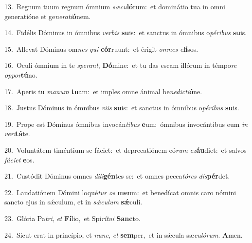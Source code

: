 {\numbfont\textcolor{\numbcolor}{13.}}~Regnum tuum regnum ómnium \textit{sæ}\-\textit{cu}\textbf{ló}rum:~\star et dominátio tua in omni generatióne et ge\-\textit{ne}\-\textit{ra}\textit{ti}\textbf{ó}nem.\par
{\numbfont\textcolor{\numbcolor}{14.}}~Fidélis Dóminus in ómnibus \textit{ver}\-\textit{bis} \textbf{su}\-is:~\star et sanctus in ómnibus o\-\textit{pé}\-\textit{ri}\textit{bus} \textbf{su}\-is.\par
{\numbfont\textcolor{\numbcolor}{15.}}~Allevat Dóminus om\textit{nes} \textit{qui} \textbf{cór}\-ruunt:~\star et érigit \textit{om}\-\textit{nes} \textit{e}\-\textbf{lí}sos.\par
{\numbfont\textcolor{\numbcolor}{16.}}~Oculi ómnium in te \textit{spe}\-\textit{rant}, \textbf{Dó}\-mine:~\star et tu das escam illórum in témpo\textit{re} \textit{op}\-\textit{por}\textbf{tú}no.\par
{\numbfont\textcolor{\numbcolor}{17.}}~Aperis tu \textit{ma}\-\textit{num} \textbf{tu}\-am:~\star et imples omne ánimal be\-\textit{ne}\-\textit{dic}\textit{ti}\textbf{ó}ne.\par
{\numbfont\textcolor{\numbcolor}{18.}}~Justus Dóminus in ómnibus \textit{vi}\-\textit{is} \textbf{su}\-is:~\star et sanctus in ómnibus o\-\textit{pé}\-\textit{ri}\textit{bus} \textbf{su}\-is.\par
{\numbfont\textcolor{\numbcolor}{19.}}~Prope est Dóminus ómnibus invocán\-\textit{ti}\-\textit{bus} \textbf{e}\-um:~\star ómnibus invocántibus eum \textit{in} \textit{ve}\-\textit{ri}\textbf{tá}te.\par
{\numbfont\textcolor{\numbcolor}{20.}}~Voluntátem timéntium se fáciet:~\dagger et deprecatiónem eó\textit{rum} \textit{ex}\-\textbf{áu}diet:~\star et salvos \textit{fá}\-\textit{ci}\textit{et} \textbf{e}\-os.\par
{\numbfont\textcolor{\numbcolor}{21.}}~Custódit Dóminus omnes \textit{di}\-\textit{li}\textbf{gén}tes se:~\star et omnes pecca\-\textit{tó}\-\textit{res} \textit{dis}\-\textbf{pér}det.\par
{\numbfont\textcolor{\numbcolor}{22.}}~Laudatiónem Dómini loqué\textit{tur} \textit{os} \textbf{me}\-um:~\star et benedícat omnis caro nómini sancto ejus in sǽculum, et in \textit{sǽ}\-\textit{cu}\textit{lum} \textbf{sǽ}\-culi.\par
{\numbfont\textcolor{\numbcolor}{23.}}~Glória Pa\-\textit{tri}\-, \textit{et} \textbf{Fí}\-lio,~\star et Spi\-\textit{rí}\-\textit{tu}\textit{i} \textbf{Sanc}\-to.\par
{\numbfont\textcolor{\numbcolor}{24.}}~Sicut erat in princípio, et \textit{nunc}\-, \textit{et} \textbf{sem}\-per,~\star et in sǽcula sæ\-\textit{cu}\-\textit{ló}\textit{rum}. \textbf{A}\-men.\par
